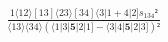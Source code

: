 \documentclass[varwidth, border=5pt]{standalone}
\begin{document}
\begin{my}
$\begin{gathered}
\scriptscriptstyle\frac{1⟨12⟩[13]⟨23⟩[34]⟨3|1+4|2]s_{134}²}{⟨13⟩⟨34⟩(⟨1|3|𝟓|2|1]-⟨3|4|𝟓|2|3])²}
\end{gathered}$
\end{my}
\end{document}
